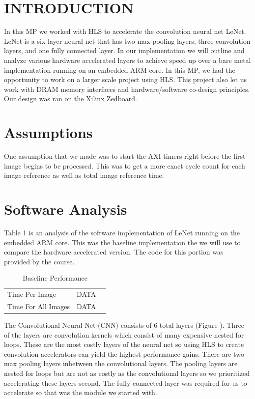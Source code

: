 \documentclass[10pt]{article}
\begin{document}
 
 
 
\section{INTRODUCTION}
In this MP we worked with HLS to accelerate the convolution neural net LeNet. LeNet is a six layer neural net that has two max pooling layers, three convolution layers, and one fully connected layer. In our implementation we will outline and analyze various hardware accelerated layers to achieve speed up over a bare metal implementation running on an embedded ARM core. In this MP, we had the opportunity to work on a larger scale project using HLS. This project also let us work with DRAM memory interfaces and hardware/software co-design principles. Our design was ran on the Xilinx Zedboard. 


\section{Assumptions}
One assumption that we made was to start the AXI timers right before the first image begins to be processed. This was to get a more exact cycle count for each image reference as well as total image reference time. 

\section{Software Analysis}
Table 1 is an analysis of the software implementation of LeNet running on the embedded ARM core. This was the baseline implementation the we will use to compare the hardware accelerated version. The code for this portion was provided by the course.

\begin{table}[H]
\begin{center}
\caption{Baseline Performance}
\begin{tabular}{lll}
\cline{1-2}
\multicolumn{1}{|l|}{Time Per Image}      & \multicolumn{1}{l|}{DATA}   \\ \cline{1-2}
\multicolumn{1}{|l|}{Time For All Images} & \multicolumn{1}{l|}{DATA}  \\ \cline{1-2}
\end{tabular}
\end{center}
\end{table}

The Convolutional Neural Net (CNN) consists of 6 total layers (Figure ). Three of the layers are convolution kernels which consist of many expensive nested for loops. These are the most costly layers of the neural net so using HLS to create convolution accelerators can yield the highest performance gains. There are two max pooling layers inbetween the convolutional layers. The pooling layers are nested for loops but are not as costly as the convolutional layers so we prioritized accelerating these layers second. The fully connected layer was required for us to accelerate so that was the module we started with.
\end{document}
